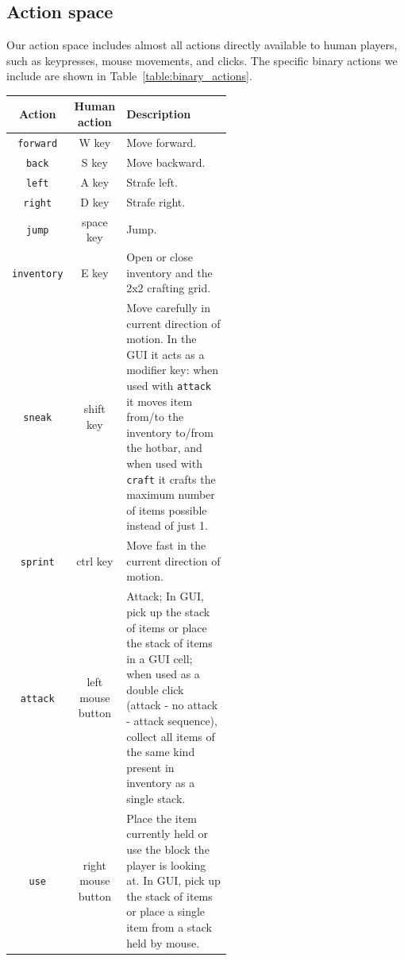 \subsection{Action space}
\label{appendix:action_space}
Our action space includes almost all actions directly available to human players, such as keypresses, mouse movements, and clicks. The specific binary actions we include are shown in Table~\ref{table:binary_actions}.

\begin{table}[htpb]
\begin{center}
\renewcommand\arraystretch{1.4}
\begin{tabular}{ |c|c|p{0.55\linewidth}| } 
\hline
 \textbf{Action} & \textbf{Human action} & \textbf{Description}\\ 
 \hline
 \texttt{forward} & W key & Move forward. \\
 
 \texttt{back} & S key & Move backward.\\ 
 
 \texttt{left} & A key & Strafe left. \\ 
 
 \texttt{right} & D key & Strafe right.\\
 
 \texttt{jump} & space key & Jump.\\
 
 \texttt{inventory} & E key & Open or close inventory and the 2x2 crafting grid. \\
 
 \texttt{sneak} & shift key & Move carefully in current direction of motion. In the GUI it acts as a modifier key: when used with \texttt{attack} it moves item from/to the inventory to/from the hotbar, and when used with \texttt{craft} it crafts the maximum number of items possible instead of just 1.\\
 
 \texttt{sprint} & ctrl key & Move fast in the current direction of motion. \\
 
 \texttt{attack} & left mouse button & Attack; In GUI, pick up the stack of items or place the stack of items in a GUI cell; when used as a double click (attack - no attack - attack sequence), collect all items of the same kind present in inventory as a single stack.\\
 
 \texttt{use} & right mouse button & Place the item currently held or use the block the player is looking at. In GUI, pick up the stack of items or place a single item from a stack held by mouse. \\
 

\end{tabular}
\end{center}
\end{table}
